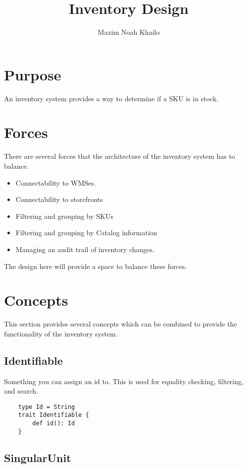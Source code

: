 \documentclass[11pt]{article}
\title{Inventory Design}
\author{Maxim Noah Khailo}
\begin{document}
\maketitle
\section{Purpose}

An inventory system provides a way to determine if a SKU is in stock. 

\section{Forces}

There are several forces that the architecture of the inventory system has to balance.

\begin{itemize}
        \item Connectability to WMSes.
        \item Connectability to storefronts
        \item Filtering and grouping by SKUs
        \item Filtering and grouping by Catalog information 
        \item Managing an audit trail of inventory changes.
\end{itemize}

The design here will provide a space to balance these forces.

\section{Concepts}

This section provides several concepts which can be combined to provide the functionality 
of the inventory system.

\subsection{Identifiable}

Something you can assign an id to. This is used for equality checking, filtering, and search.

\begin{lstlisting}
    type Id = String
    trait Identifiable {
        def id(): Id
    }
\end{lstlisting}

\subsection{SingularUnit}
\end{document}
